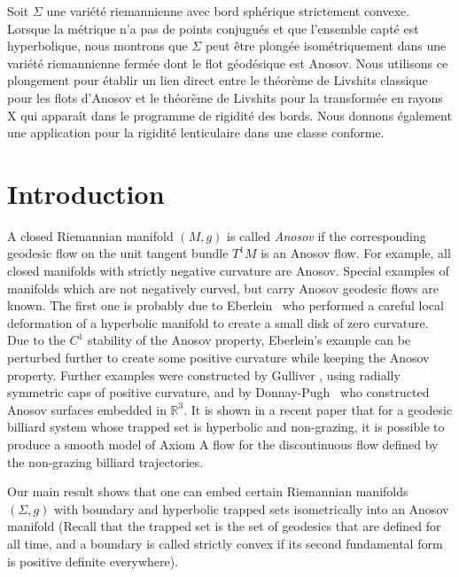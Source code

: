 \documentclass[JEP,XML,SOM,Unicode,NoFloatCountersInSection]{cedram}
\theoremstyle{definition}
\renewcommand{\>}{{\rangle}}
\newcommand{\<}{{\langle}}
\begin{document}
\begin{altabstract}
Soit $\Sigma$ une variété riemannienne avec bord sphérique strictement convexe. Lorsque la métrique n'a pas de points conjugués et que l'ensemble capté est hyperbolique, nous montrons que $\Sigma$ peut être plongée isométriquement dans une variété riemannienne fermée dont le flot géodésique est Anosov. Nous utilisons ce plongement pour établir un lien direct entre le théorème de Livshits classique pour les flots d'Anosov et le théorème de Livshits pour la transformée en rayons X qui apparaît dans le programme de rigidité des bords. Nous donnons également une application pour la rigidité lenticulaire dans une classe conforme.
\end{altabstract}
\maketitle
\vspace*{-\baselineskip}
\tableofcontents
\mainmatter

\section{Introduction}

A closed Riemannian manifold $(M,g)$ is called {\it Anosov} if the corresponding geodesic flow on the unit tangent bundle $T^1M$ is an Anosov flow. For example, all closed manifolds with strictly negative curvature are Anosov. Special examples of manifolds which are not negatively curved, but carry Anosov geodesic flows are known. The first one is probably due to Eberlein~\cite{E73} who performed a careful local deformation of a hyperbolic manifold to create a small disk of zero curvature. Due to the $C^1$ stability of the Anosov property, Eberlein's example can be perturbed further to create some positive curvature while keeping the Anosov property. Further examples were constructed by Gulliver \cite{G75}, using radially symmetric caps of positive curvature, and by Donnay-Pugh~\cite{DP03} who constructed Anosov surfaces embedded in $\mathbb R^3$. It is shown in a recent paper \cite{DSW21} that for a geodesic billiard system whose trapped set is hyperbolic and non-grazing, it is possible to produce a smooth model of Axiom A ﬂow for the discontinuous ﬂow deﬁned by the non-grazing billiard trajectories.

Our main result shows that one can embed certain Riemannian manifolds $(\Sigma, g)$ with boundary and hyperbolic trapped sets isometrically into an Anosov manifold (Recall that the trapped set is the set of geodesics that are defined for all time, and a boundary is called strictly convex if its second fundamental form is positive definite everywhere).
\end{document}
